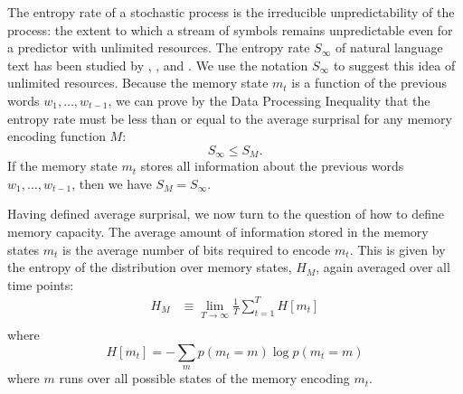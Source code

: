 The entropy rate of a stochastic process is the irreducible unpredictability of the process: the extent to which a stream of symbols remains unpredictable even for a predictor with unlimited resources. 
 The entropy rate $S_\infty$ of natural language text has been studied by \citet{shannon1951entropy}, \citet{bentz2017entropy}, and \citet{takahashi2018cross}. 
 We use the notation $S_\infty$ to suggest this idea of unlimited resources.
 Because the memory state $m_t$ is a function of the previous words $w_1, \dots, w_{t-1}$, we can prove by the Data Processing Inequality \citep[][pp. 34--35]{cover2006elements} that the entropy rate must be less than or equal to the average surprisal for any memory encoding function $M$:
\begin{equation}
    \label{eq:entropy-rate-dpi}
    S_\infty \le S_M.
\end{equation}
If the memory state $m_t$ stores all information about the previous words $w_1, \dots, w_{t-1}$, then we have $S_M = S_\infty$.

Having defined average surprisal, we now turn to the question of how to define memory capacity. The average amount of information stored in the memory states $m_t$ is the average number of bits required to encode $m_t$. 
This is given by the entropy of the distribution over memory states, $H_M$, again averaged over all time points:
\begin{align}
    \label{eq:memory-entropy}
    H_M &\equiv \lim_{T\rightarrow\infty} \frac{1}{T} \sum_{t=1}^T H[m_t] \\
\end{align}
where
\begin{equation}
    H[m_t] = - \sum_m p(m_t = m) \log p(m_t=m)
\end{equation}
where $m$ runs over all possible states of the memory encoding $m_t$.

